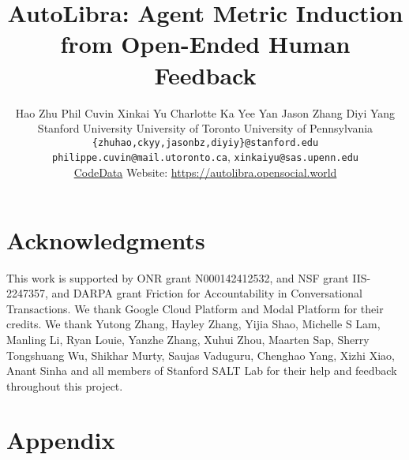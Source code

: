 \documentclass[11pt, a4paper, logo]{hzpaper}
\title{AutoLibra: Agent Metric Induction from Open-Ended Human Feedback}
\author{Hao Zhu\raisebox{0.5em}{\texttt{[image: figs/scale.png]}} Phil
Cuvin\raisebox{0.5em}{\texttt{[image: figs/microscope.png]}} Xinkai
Yu\raisebox{0.5em}{\texttt{[image: figs/ladder.png]}} Charlotte Ka Yee
Yan\raisebox{0.5em}{\texttt{[image: figs/scale.png]}} Jason Zhang\raisebox{0.5em}{\texttt{[image: figs/scale.png]}} Diyi Yang\raisebox{0.5em}{\texttt{[image: 
	figs/scale.png
]}}\\ \raisebox{0.5em}{\texttt{[image: figs/scale.png]}}Stanford
University \raisebox{0.5em}{\texttt{[image: figs/microscope.png]}}University
of Toronto \raisebox{0.5em}{\texttt{[image: figs/ladder.png]}}University
of Pennsylvania\\ \texttt{\{zhuhao,ckyy,jasonbz,diyiy\}@stanford.edu}\\ \texttt{philippe.cuvin@mail.utoronto.ca},
\texttt{xinkaiyu@sas.upenn.edu}\\ \href{https://github.com/Open-Social-World/autolibra}{Code}\quad\href{https://huggingface.co/datasets/open-social-world/autolibra}{Data}\quad
Website: \url{https://autolibra.opensocial.world}}
\begin{document}
	\maketitle
	\tableofcontents

	

	

	

	
	
	
	
	


	\section*{Acknowledgments}
	This work is supported by ONR grant N000142412532, and NSF grant IIS-2247357, and DARPA grant Friction for Accountability in Conversational Transactions.
	We thank Google Cloud Platform and Modal Platform for their credits. We thank Yutong
	Zhang, Hayley Zhang, Yijia Shao, Michelle S Lam, Manling Li, Ryan Louie, Yanzhe
	Zhang, Xuhui Zhou, Maarten Sap, Sherry Tongshuang Wu, Shikhar Murty, Saujas
	Vaduguru, Chenghao Yang, Xizhi Xiao, Anant Sinha and all members of Stanford SALT
	Lab for their help and feedback throughout this project.

	
	

	\newpage
	\appendix
	\section*{Appendix}
	
\end{document}
